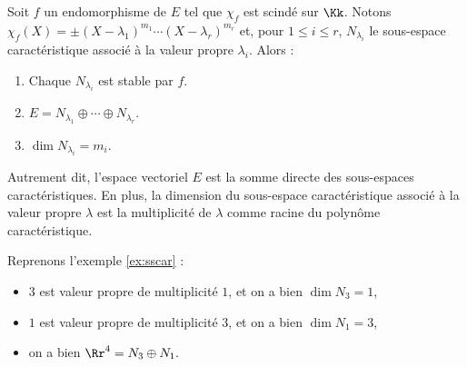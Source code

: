 \documentclass[12pt, class=report,crop=false]{standalone}
\begin{document}
\begin{theoreme}
Soit $f$ un endomorphisme de $E$ tel que $\chi_f$ est scindé sur $\Kk$.
Notons $\chi_f(X)=\pm(X-\lambda_1)^{m_1}\cdots(X-\lambda_r)^{m_r}$ et, pour $1\leq i\leq r$, $N_{\lambda_i}$ le sous-espace caractéristique associé à la
valeur propre $\lambda_i$. Alors :

\begin{enumerate}
  \item Chaque $N_{\lambda_i}$ est stable par $f$.
  \item $E=N_{\lambda_1}\oplus\cdots\oplus N_{\lambda_r}$.
  \item $\dim N_{\lambda_i}=m_i$.
\end{enumerate}
\end{theoreme} 

Autrement dit, l'espace vectoriel $E$ est la somme directe des sous-espaces caractéristiques. En plus, la dimension du sous-espace caractéristique associé à la valeur propre $\lambda$ est la multiplicité de $\lambda$ comme racine du polynôme caractéristique. 

\begin{exemple}
Reprenons l'exemple \ref{ex:sscar} :
\begin{itemize}	
  \item $3$ est valeur propre de multiplicité $1$, et on a bien $\dim N_3 = 1$,
  \item $1$ est valeur propre de multiplicité $3$, et on a bien $\dim N_1 = 3$,
  \item on a bien $\Rr^4 = N_3 \oplus N_1.$
\end{itemize}
\end{exemple}
\end{document}
